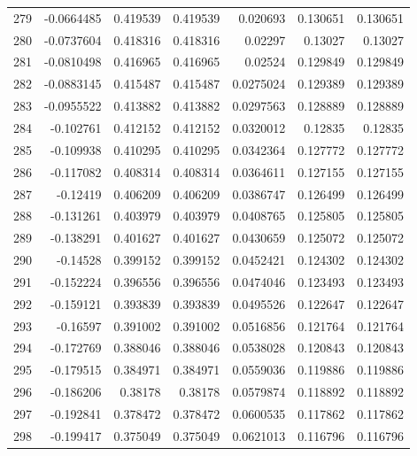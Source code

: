 \begin{tabular}{rrrrrrr}
 279 & -0.0664485   & 0.419539    & 0.419539    &  0.020693    & 0.130651    & 0.130651    \\
 280 & -0.0737604   & 0.418316    & 0.418316    &  0.02297     & 0.13027     & 0.13027     \\
 281 & -0.0810498   & 0.416965    & 0.416965    &  0.02524     & 0.129849    & 0.129849    \\
 282 & -0.0883145   & 0.415487    & 0.415487    &  0.0275024   & 0.129389    & 0.129389    \\
 283 & -0.0955522   & 0.413882    & 0.413882    &  0.0297563   & 0.128889    & 0.128889    \\
 284 & -0.102761    & 0.412152    & 0.412152    &  0.0320012   & 0.12835     & 0.12835     \\
 285 & -0.109938    & 0.410295    & 0.410295    &  0.0342364   & 0.127772    & 0.127772    \\
 286 & -0.117082    & 0.408314    & 0.408314    &  0.0364611   & 0.127155    & 0.127155    \\
 287 & -0.12419     & 0.406209    & 0.406209    &  0.0386747   & 0.126499    & 0.126499    \\
 288 & -0.131261    & 0.403979    & 0.403979    &  0.0408765   & 0.125805    & 0.125805    \\
 289 & -0.138291    & 0.401627    & 0.401627    &  0.0430659   & 0.125072    & 0.125072    \\
 290 & -0.14528     & 0.399152    & 0.399152    &  0.0452421   & 0.124302    & 0.124302    \\
 291 & -0.152224    & 0.396556    & 0.396556    &  0.0474046   & 0.123493    & 0.123493    \\
 292 & -0.159121    & 0.393839    & 0.393839    &  0.0495526   & 0.122647    & 0.122647    \\
 293 & -0.16597     & 0.391002    & 0.391002    &  0.0516856   & 0.121764    & 0.121764    \\
 294 & -0.172769    & 0.388046    & 0.388046    &  0.0538028   & 0.120843    & 0.120843    \\
 295 & -0.179515    & 0.384971    & 0.384971    &  0.0559036   & 0.119886    & 0.119886    \\
 296 & -0.186206    & 0.38178     & 0.38178     &  0.0579874   & 0.118892    & 0.118892    \\
 297 & -0.192841    & 0.378472    & 0.378472    &  0.0600535   & 0.117862    & 0.117862    \\
 298 & -0.199417    & 0.375049    & 0.375049    &  0.0621013   & 0.116796    & 0.116796    \\

\end{tabular}
